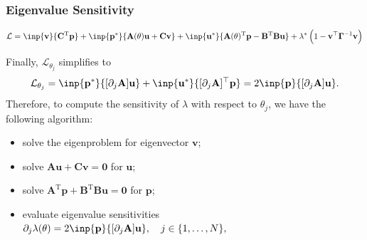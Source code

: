 \documentclass[
  pdf,
  10pt,
  xcolor={svgnames},
]{beamer}
\newcommand{\mbf}[1]{\mathbf{#1}}
\newcommand{\mc}[1]{\mathcal{#1}}
\newcommand{\T}{\mathrm{T}}
\newcommand{\mat}[1]{\mathbf{{#1}}}
\begin{document}
\begin{frame}
  \frametitle{Eigenvalue Sensitivity}
  \begin{block}{}
    \begin{equation*}
      \mc{L}
      = \inp{\mbf{v}}{\mat{C}^\T \mbf{p}}
      + \inp{\mbf{p}^*}{\mat{A}(\theta)\mbf{u} + \mat{C} \mbf{v}}
      + \inp{\mbf{u}^*}{
        \mat{A}(\theta)^\T \mbf{p} - \mat{B}^\T \mat{B} \mbf{u}
      }
      + \lambda^* \left( 1-\mbf{v}^\top \mat{\Gamma}^{-1} \mbf{v} \right)
    \end{equation*}
  \end{block}
  Finally, $\mc{L}_{\theta_j}$ simplifies to
  \begin{equation*}
    \mc{L}_{\theta_j} =
    \inp{\mbf{p}^*}{[\partial_j\mat{A}] \mbf{u}}
    + \inp{\mbf{u}^*}{[\partial_j\mat{A}]^\top \mbf{p}}
    =
    2\inp{\mbf p}{[\partial_j\mat{A}] \mbf{u}}.
  \end{equation*}
  \pause
  Therefore, to compute the sensitivity of $\lambda$ with respect to $\theta_j$,
  we have the following algorithm:
  \begin{itemize}[<+->]
    \item solve the eigenproblem for eigenvector $\mbf{v}$;
    \item solve $\mat{A} \mbf{u} + \mat{C} \mbf{v} = \mbf{0}$ for $\mbf{u}$;
    \item solve $\mat{A}^\T \mbf{p} + \mat{B}^\T\mat{B}\mbf{u} = \mbf{0}$ for
          $\mbf{p}$;
    \item evaluate eigenvalue sensitivities \(
          \partial_j \lambda(\mbf\theta)
          = 2\inp{\mbf p}{[\partial_j\mat{A}] \mbf{u}},
          \quad j \in \{1, \ldots, N\},
          \)
  \end{itemize}
\end{frame}
\end{document}
